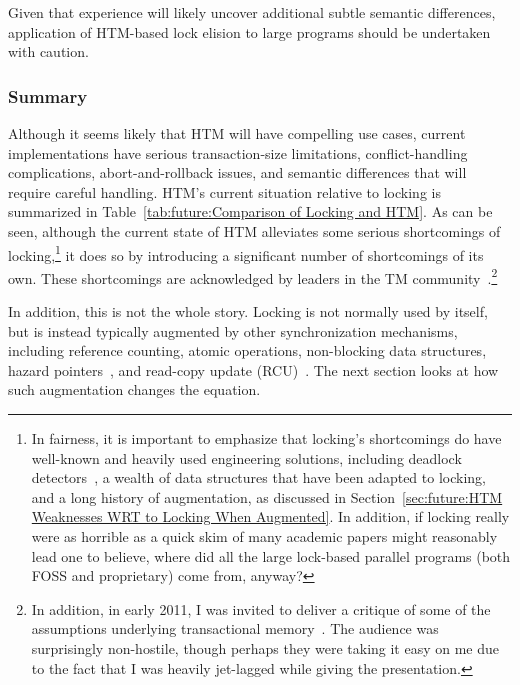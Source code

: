 Given that experience will likely uncover additional subtle semantic
differences, application of HTM-based lock elision to large programs
should be undertaken with caution.

\subsubsection{Summary}
\label{sec:future:HTM Weaknesses WRT Locking: Summary}



Although it seems likely that HTM will have compelling use cases,
current implementations have serious transaction-size limitations,
conflict-handling complications, abort-and-rollback issues, and
semantic differences that will require careful handling.
HTM's current situation relative to locking is summarized in
Table~\ref{tab:future:Comparison of Locking and HTM}.
As can be seen, although the current state of HTM alleviates some
serious shortcomings of locking,\footnote{
	In fairness, it is important to emphasize that locking's shortcomings
	do have well-known and heavily used engineering solutions, including
	deadlock detectors~\cite{JonathanCorbet2006lockdep}, a wealth
	of data structures that have been adapted to locking, and
	a long history of augmentation, as discussed in
	Section~\ref{sec:future:HTM Weaknesses WRT to Locking When Augmented}.
	In addition, if locking really were as horrible as a quick skim
	of many academic papers might reasonably lead one to believe,
	where did all the large lock-based parallel programs (both
	FOSS and proprietary) come from, anyway?}
it does so by introducing a significant
number of shortcomings of its own.
These shortcomings are acknowledged by leaders in the TM
community~\cite{AlexanderMatveev2012PessimisticTM}.\footnote{
	In addition, in early 2011, I was invited to deliver a critique of
	some of the assumptions underlying transactional
	memory~\cite{PaulEMcKenney2011Verico}.
	The audience was surprisingly non-hostile, though perhaps they
	were taking it easy on me due to the fact that I was heavily
	jet-lagged while giving the presentation.}

In addition, this is not the whole story.
Locking is not normally used by itself, but is instead typically
augmented by other synchronization mechanisms,
including reference counting, atomic operations, non-blocking data structures,
hazard pointers~\cite{MagedMichael04a,HerlihyLM02},
and read-copy update (RCU)~\cite{McKenney98,McKenney01a,ThomasEHart2007a,PaulEMcKenney2012ELCbattery}.
The next section looks at how such augmentation changes the equation.

